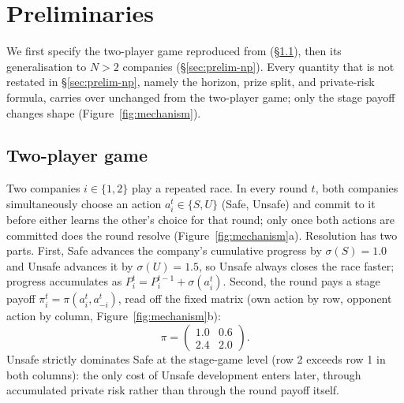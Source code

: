 \documentclass[sigconf,anonymous]{aamas}
\begin{document}
\section{Preliminaries}
\label{sec:preliminaries}

We first specify the two-player game reproduced from \citet{falling_behind_unsafe} (\S\ref{sec:prelim-2p}), then its generalisation to $N>2$ companies (\S\ref{sec:prelim-np}). Every quantity that is not restated in \S\ref{sec:prelim-np}, namely the horizon, prize split, and private-risk formula, carries over unchanged from the two-player game; only the stage payoff changes shape (Figure~\ref{fig:mechanism}).

\subsection{Two-player game}
\label{sec:prelim-2p}

Two companies $i \in \{1,2\}$ play a repeated race. In every round $t$, both companies simultaneously choose an action $a_i^t \in \{S, U\}$ (Safe, Unsafe) and commit to it before either learns the other's choice for that round; only once both actions are committed does the round resolve (Figure~\ref{fig:mechanism}a). Resolution has two parts. First, Safe advances the company's cumulative progress by $\sigma(S)=1.0$ and Unsafe advances it by $\sigma(U)=1.5$, so Unsafe always closes the race faster; progress accumulates as $P_i^t = P_i^{t-1}+\sigma(a_i^t)$. Second, the round pays a stage payoff $\pi_i^t=\pi(a_i^t,a_{-i}^t)$, read off the fixed matrix (own action by row, opponent action by column, Figure~\ref{fig:mechanism}b):
\begin{equation}
    \pi = \begin{pmatrix} 1.0 & 0.6 \\ 2.4 & 2.0 \end{pmatrix}.
    \label{eq:2p-matrix}
\end{equation}
Unsafe strictly dominates Safe at the stage-game level (row 2 exceeds row 1 in both columns): the only cost of Unsafe development enters later, through accumulated private risk rather than through the round payoff itself.
\end{document}
